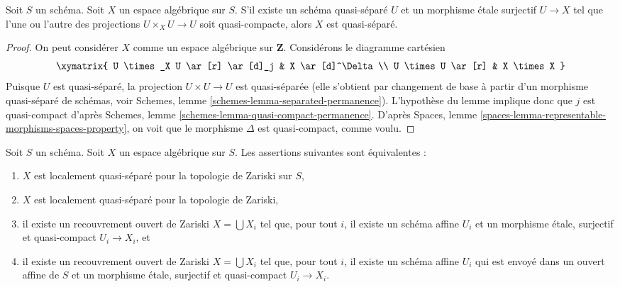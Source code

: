 \begin{lemma}
\label{lemma-quasi-separated}
Soit $S$ un schéma. Soit $X$ un espace algébrique sur $S$.
S'il existe un schéma quasi-séparé $U$ et un morphisme
étale surjectif $U \to X$ tel que l'une ou l'autre des projections
$U \times_X U \to U$ soit quasi-compacte, alors $X$ est quasi-séparé.
\end{lemma}

\begin{proof}
On peut considérer $X$ comme un espace algébrique sur $\mathbf{Z}$.
Considérons le diagramme cartésien
$$
\xymatrix{
U \times_X U \ar[r] \ar[d]_j & X \ar[d]^\Delta \\
U \times U \ar[r] & X \times X
}
$$
Puisque $U$ est quasi-séparé, la projection $U \times U \to U$ est
quasi-séparée (elle s'obtient par changement de base à partir d'un morphisme
quasi-séparé de schémas, voir Schemes, lemme \ref{schemes-lemma-separated-permanence}).
L'hypothèse du lemme implique donc que $j$ est quasi-compact d'après
Schemes, lemme \ref{schemes-lemma-quasi-compact-permanence}.
D'après Spaces, lemme \ref{spaces-lemma-representable-morphisms-spaces-property},
on voit que le morphisme $\Delta$ est quasi-compact, comme voulu.
\end{proof}

\begin{lemma}
\label{lemma-quasi-separated-quasi-compact-pieces}
Soit $S$ un schéma.
Soit $X$ un espace algébrique sur $S$.
Les assertions suivantes sont équivalentes :
\begin{enumerate}
\item $X$ est localement quasi-séparé pour la topologie de Zariski sur $S$,
\item $X$ est localement quasi-séparé pour la topologie de Zariski,
\item il existe un recouvrement ouvert de Zariski $X = \bigcup X_i$
tel que, pour tout $i$, il existe un schéma affine
$U_i$ et un morphisme étale, surjectif et quasi-compact
$U_i \to X_i$, et
\item il existe un recouvrement ouvert de Zariski $X = \bigcup X_i$
tel que, pour tout $i$, il existe un schéma affine
$U_i$ qui est envoyé dans un ouvert affine de $S$ et un morphisme
étale, surjectif et quasi-compact $U_i \to X_i$.
\end{enumerate}
\end{lemma}

